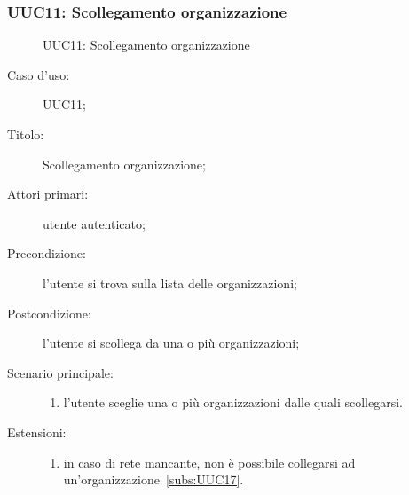 \documentclass[../../../analisi-dei-requisiti.tex]{subfiles}
\begin{document}
\subsubsection{UUC11: Scollegamento organizzazione}%
\label{subs:UUC11}

\begin{figure}[H]
  \centering
  \caption{UUC11: Scollegamento organizzazione}%
  \label{fig:UUC11}
\end{figure}

\begin{description}
  \item[Caso d'uso:] UUC11;
  \item[Titolo:] Scollegamento organizzazione;
  \item[Attori primari:] utente autenticato;
  \item[Precondizione:] l'utente si trova sulla lista delle organizzazioni;
  \item[Postcondizione:] l'utente si scollega da una o più organizzazioni;
  \item[Scenario principale:]
        \begin{enumerate}
          \item l'utente sceglie una o più organizzazioni dalle quali scollegarsi.
        \end{enumerate}
  \item[Estensioni:]
        \begin{enumerate}
          \item in caso di rete mancante, non è possibile collegarsi ad un'organizzazione~\ref{subs:UUC17}.
        \end{enumerate}
\end{description}
\end{document}
